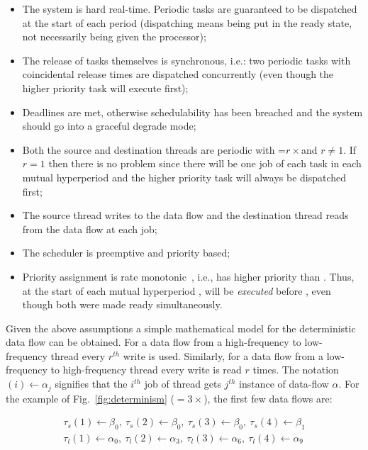 \begin{itemize}
\item{The system is hard real-time. Periodic tasks are guaranteed to
  be dispatched at the start of each period (dispatching means being
  put in the ready state, not necessarily being given the processor);}
\item{The release of tasks themselves is synchronous, i.e.: two
  periodic tasks with coincidental release times are dispatched
  concurrently (even though the higher priority task will execute
  first);}
\item{Deadlines are met, otherwise schedulability has been breached
  and the system should go into a graceful degrade mode;}
\item{Both the source and destination threads are periodic with
  \plong=$r\times$\pshort and $r\neq1$. If $r=1$ then there is no
  problem since there will be one job of each task in each mutual
  hyperperiod and the higher priority task will always be dispatched
  first;}
\item{The source thread writes to the data flow and the destination
  thread reads from the data flow at each job;}
\item{The scheduler is preemptive and priority based;}
\item{Priority assignment is rate monotonic~\cite{liu@jacm73}, i.e.,
  \ts has higher priority than \tl. Thus, at the start of each mutual
  hyperperiod \plong, \ts will be \emph{executed} before \tl, even
  though both were made ready simultaneously.}
\end{itemize}

Given the above assumptions a simple mathematical model for the
deterministic data flow can be obtained. For a data flow from a
high-frequency to low-frequency thread every $r^{th}$ write is
used. Similarly, for a data flow from a low-frequency to
high-frequency thread every write is read $r$ times. The
notation~\tl$(i)\gets\alpha_j$ signifies that the $i^{th}$ job of
thread \tl gets $j^{th}$ instance of data-flow $\alpha$. For the
example of Fig.~\ref{fig:determinism} (\plong$=3\times$\pshort), the
first few data flows are:

\begin{displaymath}
  \begin{split}
  \tau_s(1)\gets\beta_0,\ \tau_s(2)\gets\beta_0,\
  \tau_s(3)\gets\beta_0,\ \tau_s(4)\gets\beta_1\\
  \tau_l(1)\gets\alpha_0,\ \tau_l(2)\gets\alpha_3,\
  \tau_l(3)\gets\alpha_6,\ \tau_l(4)\gets\alpha_9
  \end{split}
\end{displaymath}

